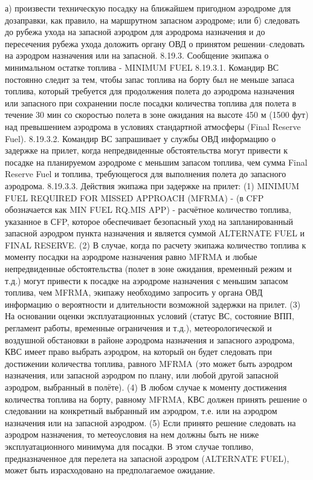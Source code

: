 а)	произвести техническую посадку на ближайшем пригодном аэродроме для дозаправки, как правило, на маршрутном запасном аэродроме; или
б)	следовать до рубежа ухода на запасной аэродром для аэродрома назначения и до пересечения рубежа ухода доложить органу ОВД о принятом решении–следовать на аэродром назначения или на запасной.
8.19.3.	Сообщение экипажа о минимальном остатке топлива - MINIMUM FUEL
8.19.3.1. Командир ВС постоянно следит за тем, чтобы запас топлива на борту был не меньше запаса топлива, который требуется для продолжения полета до аэродрома назначения или запасного при сохранении после посадки количества топлива для полета в течение 30 мин со скоростью полета в зоне ожидания на высоте 450 м (1500 фут) над превышением аэродрома в условиях стандартной атмосферы (Final Reserve Fuel).
8.19.3.2. Командир ВС запрашивает у службы ОВД информацию о задержке на прилет, когда непредвиденные обстоятельства могут привести к посадке на планируемом аэродроме с меньшим запасом топлива, чем сумма Final Reserve Fuel и топлива, требующегося для выполнения полета до запасного аэродрома.
8.19.3.3. Действия экипажа при задержке на прилет:
(1) MINIMUM FUEL REQUIRED FOR MISSED APPROACH (MFRMA) - (в CFP обозначается как MIN FUEL RQ.MIS APP) - расчётное количество топлива, указанное в СFP, которое обеспечивает безопасный уход на запланированный запасной аэродром пункта назначения и является суммой ALTERNATE FUEL и FINAL RESERVE. 
(2) В случае, когда по расчету экипажа количество топлива к моменту посадки на аэродроме назначения равно MFRMA и любые непредвиденные обстоятельства (полет в зоне ожидания, временный режим и т.д.) могут привести к посадке на аэродроме назначения с меньшим запасом топлива, чем MFRMA, экипажу необходимо запросить у органа ОВД информацию о вероятности и длительности возможной задержки на прилет.
(3) На основании оценки эксплуатационных условий (статус ВС, состояние ВПП, регламент работы, временные ограничения и т.д.), метеорологической и воздушной обстановки в районе аэродрома назначения и запасного аэродрома, КВС имеет право выбрать аэродром, на который он будет следовать при достижении количества топлива, равного MFRMA (это может быть аэродром назначения, или запасной аэродром по плану, или любой другой запасной аэродром, выбранный в полёте).
(4) В любом случае к моменту достижения количества топлива на борту, равному MFRMA, КВС должен принять решение о следовании на конкретный выбранный им аэродром, т.е. или на аэродром назначения или на запасной аэродром.
(5) Если принято решение следовать на аэродром назначения, то метеоусловия на нем должны быть не ниже эксплуатационного минимума для посадки. В этом случае топливо, предназначенное для перелета на запасной аэродром (ALTERNATE FUEL), может быть израсходовано на предполагаемое ожидание.
